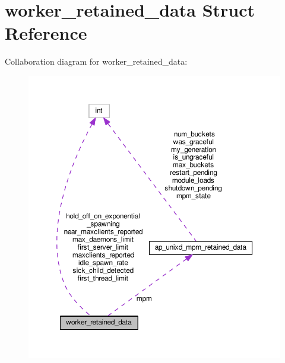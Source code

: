 \hypertarget{structworker__retained__data}{}\section{worker\+\_\+retained\+\_\+data Struct Reference}
\label{structworker__retained__data}


Collaboration diagram for worker\+\_\+retained\+\_\+data\+:
\nopagebreak
\begin{figure}[H]
\begin{center}
\leavevmode
\includegraphics[width=350pt]{structworker__retained__data__coll__graph}
\end{center}
\end{figure}
